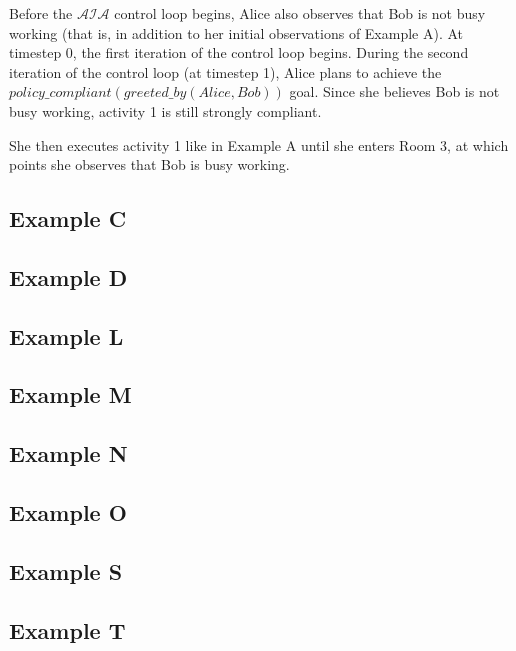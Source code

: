 Before the $\mathcal{AIA}$ control loop begins, Alice also observes that Bob is not busy working (that is, in addition to her initial observations of Example A).
At timestep 0, the first iteration of the control loop begins.
During the second iteration of the control loop (at timestep 1), Alice plans to achieve the $policy\_compliant(greeted\_by(Alice, Bob))$ goal.
Since she believes Bob is not busy working, activity 1 is still strongly compliant.

She then executes activity 1 like in Example A until she enters Room 3, at which points she observes that Bob is busy working.

\subsection{Example C}

\subsection{Example D}

\subsection{Example L}

\subsection{Example M}

\subsection{Example N}

\subsection{Example O}

\subsection{Example S}

\subsection{Example T}
